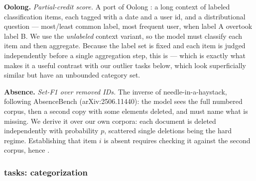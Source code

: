 \textbf{Oolong.} \emph{Partial-credit score.} A port of Oolong \citep{Bertsch2025OolongEL}: a long context of labeled classification items, each tagged with a date and a user id, and a distributional question --- most/least common label, most frequent user, when label A overtook label B. We use the \emph{unlabeled} context variant, so the model must classify each item and then aggregate. Because the label set is fixed and each item is judged independently before a single aggregation step, this is  --- which is exactly what makes it a useful contrast with our outlier tasks below, which look superficially similar but have an unbounded category set.


\textbf{Absence.} \emph{Set-F1 over removed IDs.} The inverse of needle-in-a-haystack, following AbsenceBench (arXiv:2506.11440): the model sees the full numbered corpus, then a second copy with some elements deleted, and must name what is missing. We derive it over our own corpora: each document is deleted independently with probability $p$, scattered single deletions being the hard regime. Establishing that item $i$ is absent requires checking it against the second corpus, hence .


\subsubsection{\texorpdfstring{}{OT(NM)} tasks: categorization}

